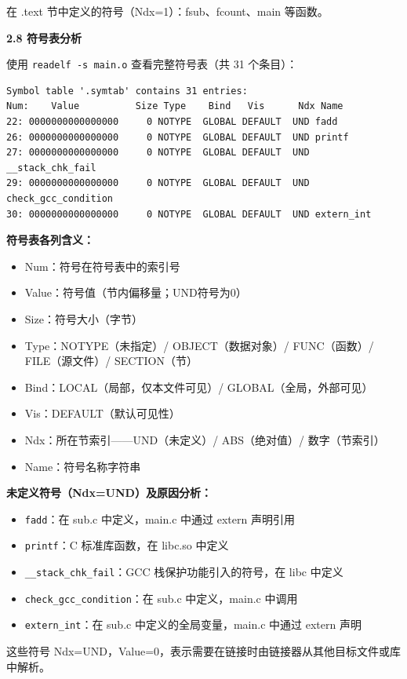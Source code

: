 \documentclass[12pt,a4paper]{ctexart}
\begin{document}
在 .text 节中定义的符号（Ndx=1）：fsub、fcount、main 等函数。

\textbf{2.8 符号表分析}

使用 \texttt{readelf -s main.o} 查看完整符号表（共 31 个条目）：

\begin{lstlisting}
Symbol table '.symtab' contains 31 entries:
Num:    Value          Size Type    Bind   Vis      Ndx Name
22: 0000000000000000     0 NOTYPE  GLOBAL DEFAULT  UND fadd
26: 0000000000000000     0 NOTYPE  GLOBAL DEFAULT  UND printf
27: 0000000000000000     0 NOTYPE  GLOBAL DEFAULT  UND __stack_chk_fail
29: 0000000000000000     0 NOTYPE  GLOBAL DEFAULT  UND check_gcc_condition
30: 0000000000000000     0 NOTYPE  GLOBAL DEFAULT  UND extern_int
\end{lstlisting}

\textbf{符号表各列含义：}
\begin{itemize}[nosep]
    \item Num：符号在符号表中的索引号
    \item Value：符号值（节内偏移量；UND符号为0）
    \item Size：符号大小（字节）
    \item Type：NOTYPE（未指定）/ OBJECT（数据对象）/ FUNC（函数）/ FILE（源文件）/ SECTION（节）
    \item Bind：LOCAL（局部，仅本文件可见）/ GLOBAL（全局，外部可见）
    \item Vis：DEFAULT（默认可见性）
    \item Ndx：所在节索引——UND（未定义）/ ABS（绝对值）/ 数字（节索引）
    \item Name：符号名称字符串
\end{itemize}

\textbf{未定义符号（Ndx=UND）及原因分析：}
\begin{itemize}[nosep]
    \item \texttt{fadd}：在 sub.c 中定义，main.c 中通过 extern 声明引用
    \item \texttt{printf}：C 标准库函数，在 libc.so 中定义
    \item \texttt{\_\_stack\_chk\_fail}：GCC 栈保护功能引入的符号，在 libc 中定义
    \item \texttt{check\_gcc\_condition}：在 sub.c 中定义，main.c 中调用
    \item \texttt{extern\_int}：在 sub.c 中定义的全局变量，main.c 中通过 extern 声明
\end{itemize}

这些符号 Ndx=UND，Value=0，表示需要在链接时由链接器从其他目标文件或库中解析。
\end{document}

